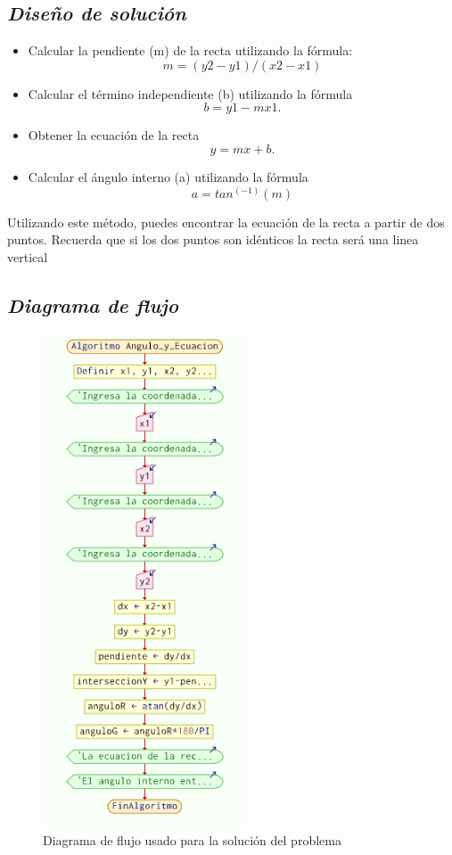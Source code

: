 \subsection{\textbf{\textit{Diseño de solución }}}
\begin{itemize}
  \item Calcular la pendiente (m) de la recta utilizando la fórmula:
\begin{equation}
    m = (y2 - y1) / (x2 - x1)
\end{equation}
   
  \item  Calcular el término independiente (b)  utilizando la fórmula 
 \begin{equation}
     b = y1 - mx1.
\end{equation}
  \item Obtener la ecuación de la recta
   \begin{equation}
     y = mx + b.
\end{equation}
  \item Calcular el ángulo interno (a) utilizando la fórmula
    \begin{equation}
      a = tan^(-1)(m)
    \end{equation}
\end{itemize}
Utilizando este método, puedes encontrar la ecuación de la recta a partir de dos puntos. Recuerda que si los dos puntos son idénticos la recta será una linea vertical
\cite{rectaPendiente}

\subsection{ \textbf{\textit{Diagrama de flujo }}}

\begin{figure}[H]
    \centering
    \includegraphics[width=6cm]{LaTeX/latex-imagenes/Diagrama de flujo.png}
    \caption{Diagrama de flujo usado para la solución del problema}
\end{figure}
